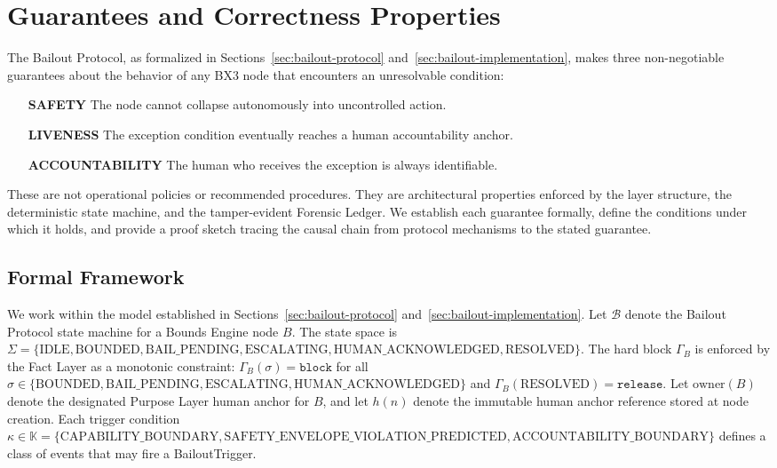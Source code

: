 \section{Guarantees and Correctness Properties}
\label{sec:guarantees}

The Bailout Protocol, as formalized in Sections~\ref{sec:bailout-protocol} and~\ref{sec:bailout-implementation}, makes three non-negotiable guarantees about the behavior of any BX3 node that encounters an unresolvable condition:

\begin{itemize}
    \item[\textbf{SAFETY}] The node cannot collapse autonomously into uncontrolled action.
    \item[\textbf{LIVENESS}] The exception condition eventually reaches a human accountability anchor.
    \item[\textbf{ACCOUNTABILITY}] The human who receives the exception is always identifiable.
\end{itemize}

These are not operational policies or recommended procedures. They are architectural properties enforced by the layer structure, the deterministic state machine, and the tamper-evident Forensic Ledger. We establish each guarantee formally, define the conditions under which it holds, and provide a proof sketch tracing the causal chain from protocol mechanisms to the stated guarantee.

\subsection{Formal Framework}

We work within the model established in Sections~\ref{sec:bailout-protocol} and~\ref{sec:bailout-implementation}. Let $\mathcal{B}$ denote the Bailout Protocol state machine for a Bounds Engine node $B$. The state space is $\Sigma = \{\text{IDLE}, \text{BOUNDED}, \text{BAIL\_PENDING}, \text{ESCALATING}, \text{HUMAN\_ACKNOWLEDGED}, \text{RESOLVED}\}$. The hard block $\Gamma_B$ is enforced by the Fact Layer as a monotonic constraint: $\Gamma_B(\sigma) = \texttt{block}$ for all $\sigma \in \{\text{BOUNDED}, \text{BAIL\_PENDING}, \text{ESCALATING}, \text{HUMAN\_ACKNOWLEDGED}\}$ and $\Gamma_B(\text{RESOLVED}) = \texttt{release}$. Let $\text{owner}(B)$ denote the designated Purpose Layer human anchor for $B$, and let $h(n)$ denote the immutable human anchor reference stored at node creation. Each trigger condition $\kappa \in \mathbb{K} = \{\text{CAPABILITY\_BOUNDARY}, \text{SAFETY\_ENVELOPE\_VIOLATION\_PREDICTED}, \text{ACCOUNTABILITY\_BOUNDARY}\}$ defines a class of events that may fire a BailoutTrigger.


